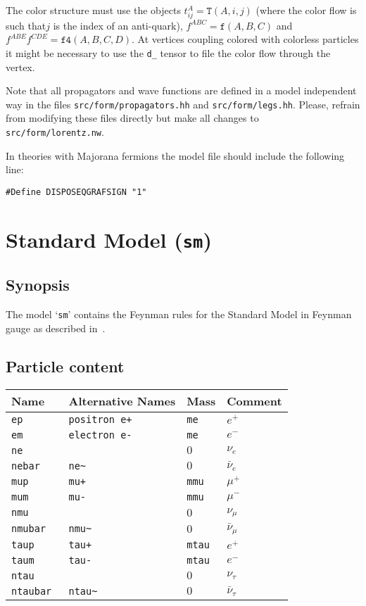 \documentclass[11pt,a4paper]{refrep}
\begin{document}
The color structure must use the objects $t_{ij}^A=\mathtt{T}(A, i, j)$ (where the color flow is such
that$j$ is the index of an anti-quark), $f^{ABC}=\mathtt{f}(A, B, C)$ and
$f^{ABE}f^{CDE}=\mathtt{f4}(A,B,C,D)$. At vertices coupling colored with colorless particles
it might be necessary to use the \texttt{d\_} tensor to file the color flow through the vertex.

\attention Note that all propagators and wave functions are defined in a model independent
way in the files \texttt{src/form/propagators.hh} and \texttt{src/form/legs.hh}. Please,
refrain from modifying these files directly but make all changes to \texttt{src/form/lorentz.nw}.

In theories with Majorana fermions the model file should include the following
line:
\begin{lstlisting}[language=form]
#Define DISPOSEQGRAFSIGN "1"
\end{lstlisting}

\section{Standard Model (\texttt{sm})}
\label{sec:model-files:sm}
\subsection{Synopsis}
The model `\texttt{sm}' contains the Feynman rules for the
Standard Model in Feynman gauge as described
in~\cite[Appendix~A]{Boehm:2001}.

\subsection{Particle content}
\begin{tabular}{|l|l|l|p{2cm}|}
\hline
Name&Alternative Names&Mass&Comment\\
\hline
\tt ep & \tt positron e+ & \tt me& $e^+$\\
\tt em & \tt electron e- & \tt me& $e^-$\\
\tt ne & & $0$ & $\nu_e$\\
\tt nebar & \tt ne\~& $0$ & $\bar{\nu}_e$\\
\hline
\tt mup & \tt mu+ & \tt mmu& $\mu^+$\\
\tt mum & \tt mu- & \tt mmu& $\mu^-$\\
\tt nmu & & $0$ & $\nu_\mu$\\
\tt nmubar & \tt nmu\~ & $0$ & $\bar{\nu}_\mu$\\
\hline
\tt taup & \tt tau+ & \tt mtau& $e^+$\\
\tt taum & \tt tau- & \tt mtau& $e^-$\\
\tt ntau & & $0$ & $\nu_\tau$\\
\tt ntaubar & \tt ntau\~ & $0$ & $\bar{\nu}_\tau$\\
\hline
\end{tabular}
\end{document}
